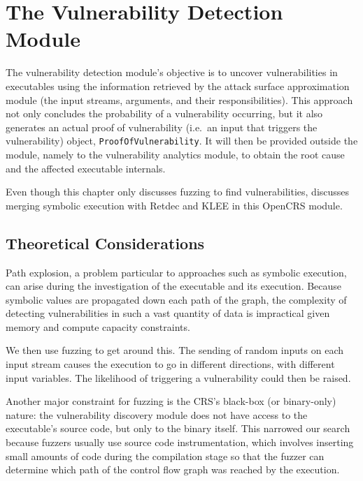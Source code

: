 \documentclass[../main.tex]{subfiles}
\begin{document}
\hypertarget{vulnerability-detection-module}{%
  \chapter{The Vulnerability Detection
    Module}\label{vulnerability-detection-module}}

The vulnerability detection module's \cite{vulnerability_detection_module_repo}
objective is to uncover vulnerabilities in executables using the information
retrieved by the attack surface approximation module (the input streams,
arguments, and their responsibilities). This approach not only concludes the
probability of a vulnerability occurring, but it also generates an actual proof
of vulnerability (i.e.~an input that triggers the vulnerability) object,
\texttt{ProofOfVulnerability}. It will then be provided outside the module,
namely to the vulnerability analytics module, to obtain the root cause and the
affected executable internals.

Even though this chapter only discusses fuzzing to find vulnerabilities,
\cite{bogdan} discusses merging symbolic execution with
Retdec and
KLEE in this OpenCRS module.

\hypertarget{theoretical-considerations}{%
  \section{Theoretical Considerations}\label{theoretical-considerations}}

Path explosion, a problem particular to approaches such as symbolic execution,
can arise during the investigation of the executable and its execution. Because
symbolic values are propagated down each path of the graph, the complexity of
detecting vulnerabilities in such a vast quantity of data is impractical given
memory and compute capacity constraints.

We then use fuzzing to get around this. The sending of random inputs on each
input stream causes the execution to go in different directions, with different
input variables. The likelihood of triggering a vulnerability could then be
raised.

Another major constraint for fuzzing is the CRS's black-box (or binary-only)
nature: the vulnerability discovery module does not have access to the
executable's source code, but only to the binary itself. This narrowed our
search because fuzzers usually use source code instrumentation, which involves
inserting small amounts of code during the compilation stage so that the fuzzer
can determine which path of the control flow graph was reached by the
execution.
\end{document}
